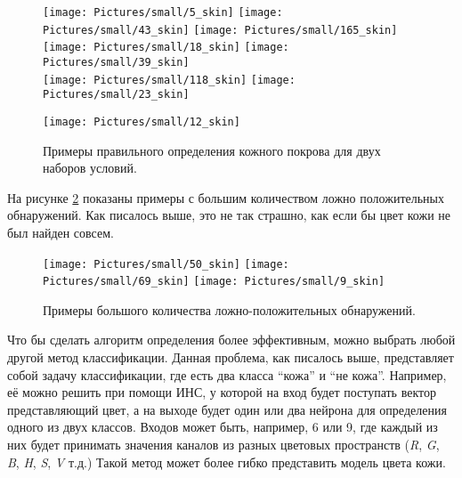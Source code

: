 \documentclass[12pt]{report}
\begin{document}
\begin{figure}[p]
	\centering	
	\texttt{[image: Pictures/small/5\_skin]}\hspace{0.2cm}
	\texttt{[image: Pictures/small/43\_skin]}\hspace{0.2cm}
	\texttt{[image: Pictures/small/165\_skin]}
	\\[0.5cm]
	\texttt{[image: Pictures/small/18\_skin]}\hspace{0.2cm}
	\texttt{[image: Pictures/small/39\_skin]}
	\\[0.5cm]
	\texttt{[image: Pictures/small/118\_skin]}\hspace{0.2cm}
	\texttt{[image: Pictures/small/23\_skin]}
	
	\texttt{[image: Pictures/small/12\_skin]}
	\caption{Примеры правильного определения кожного покрова для двух наборов условий.}	
	\label{fig:skin_contour_samples}
\end{figure}

На рисунке \ref{fig:many_false_possitives} показаны примеры с большим количеством ложно положительных обнаружений. 
Как писалось выше, это не так страшно, как если бы цвет кожи не был найден совсем.
\begin{figure}[h]
	\centering	
	\texttt{[image: Pictures/small/50\_skin]}\hspace{0.2cm}
	\texttt{[image: Pictures/small/69\_skin]}\hspace{0.2cm}
	\texttt{[image: Pictures/small/9\_skin]}\hspace{0.2cm}
		
	\caption{Примеры большого количества ложно-положительных обнаружений.}	
	\label{fig:many_false_possitives}
\end{figure}

Что бы сделать алгоритм определения более эффективным, можно выбрать любой другой метод классификации. Данная 
проблема, как писалось выше, представляет собой задачу классификации, где есть два класса ``кожа'' и ``не кожа''. 
Например, её можно решить при помощи ИНС, у которой на вход будет поступать вектор представляющий цвет, 
а на выходе будет один или два нейрона для определения одного из двух классов. Входов может быть, например, 6 или 9, 
где каждый из них будет принимать значения каналов из разных цветовых пространств (\textit{R}, \textit{G}, \textit
{B}, \textit{H}, \textit{S}, \textit{V} т.д.) Такой метод может более гибко представить модель цвета кожи.
\end{document}
